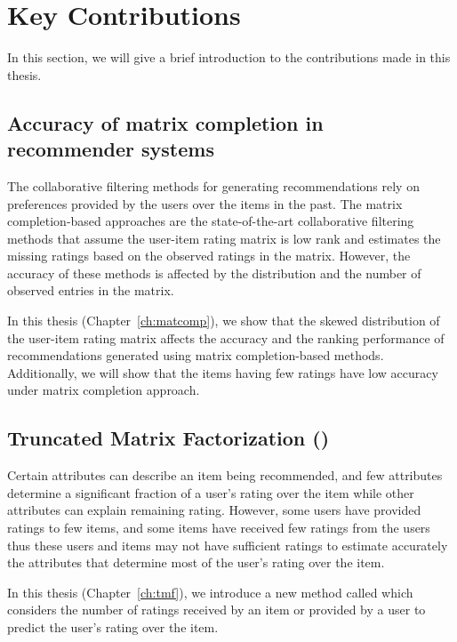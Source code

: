 \section{Key Contributions}
\label{ch:intro:contr}

In this section, we will give a brief introduction to the contributions made in this thesis. 


\subsection{Accuracy of matrix completion in recommender systems}
The collaborative filtering methods for generating recommendations rely on preferences
provided by the users over the items in the past. The matrix completion-based approaches
are the state-of-the-art collaborative filtering methods that assume the user-item
rating matrix is low rank and estimates the missing ratings based on the observed
ratings in the matrix. However, the accuracy of these methods is affected by the
distribution and the number of observed entries in the matrix.  

In this thesis (Chapter~\ref{ch:matcomp}), we show that the skewed distribution of the
user-item rating matrix affects the accuracy and the ranking performance of
recommendations generated using matrix completion-based methods. Additionally, we will
show that the items having few ratings have low accuracy under matrix completion approach.


\subsection{Truncated Matrix Factorization  (\TMF)}
Certain attributes can describe an item being recommended, and few attributes
determine a significant fraction of a user's rating over the item while other
attributes can explain remaining rating. However, some users have provided ratings
to few items, and some items have received few ratings from the users thus these
users and items may not have sufficient ratings to estimate accurately the
attributes that determine most of the user's rating over the item.

In this thesis (Chapter~\ref{ch:tmf}), we introduce a new method called \TMF
which considers the number of ratings received by an item or provided by a user to predict the user's rating over the item. 


